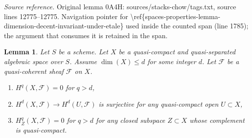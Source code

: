 \documentclass[10pt,a4paper]{amsart}
\theoremstyle{plain}
\newtheorem{lemma}[subsection]{Lemma}
\theoremstyle{definition}
\theoremstyle{remark}
\numberwithin{equation}{subsection}
\begin{document}
\noindent\textit{Source reference.} Original lemma 0A4H: sources/stacks-chow/tags.txt, source lines 12775--12775. Navigation pointer for \textbackslash{}ref\{spaces-properties-lemma-dimension-decent-invariant-under-etale\} used inside the counted span (line 1785); the argument that consumes it is retained in the span.\par\medskip
\begin{lemma}
\label{lemma-vanishing-above-dimension}
Let $S$ be a scheme. Let $X$ be a quasi-compact and quasi-separated
algebraic space over $S$. Assume $\dim(X) \leq d$ for some integer $d$.
Let $\mathcal{F}$ be a quasi-coherent sheaf $\mathcal{F}$ on $X$.
\begin{enumerate}
\item $H^q(X, \mathcal{F}) = 0$ for $q > d$,
\item $H^d(X, \mathcal{F}) \to H^d(U, \mathcal{F})$ is surjective
for any quasi-compact open $U \subset X$,
\item $H^q_Z(X, \mathcal{F}) = 0$ for $q > d$ for any closed subspace
$Z \subset X$ whose complement is quasi-compact.
\end{enumerate}
\end{lemma}
\end{document}
